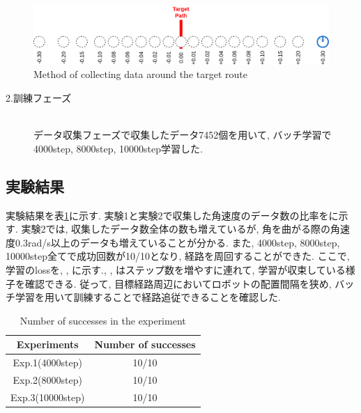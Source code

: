 \begin{figure}[h]
  \centering
  \includegraphics[keepaspectratio, scale=0.18]{images/collect-data.png}
  \caption{Method of collecting data around the target route}
  \label{Fig:collect-data}
  \end{figure}

\begin{description}
  \item[2.訓練フェーズ]\mbox{}\\データ収集フェーズで収集したデータ7452個を用いて, バッチ学習で4000step, 8000step, 10000step学習した. 
\end{description}

\newpage
\subsection{実験結果}
実験結果を表\ref{tb:exp2.2}に示す. 実験1と実験2で収集した角速度のデータ数の比率をに示す. 実験2では, 収集したデータ数全体の数も増えているが, 角を曲がる際の角速度0.3rad/s以上のデータも増えていることが分かる. また, 4000step, 8000step, 10000step全てで成功回数が10/10となり, 経路を周回することができた. ここで, 学習のlossを, , に示す., , はステップ数を増やすに連れて, 学習が収束している様子を確認できる. 従って, 目標経路周辺においてロボットの配置間隔を狭め, バッチ学習を用いて訓練することで経路追従できることを確認した. 

\vspace{10mm}
\begin{table}[h]
  \centering
  \caption{Number of successes in the experiment}
  \begin{tabular}{|c|c|} \hline
    Experiments & Number of successes \\ \hline
    Exp.1(4000step) & 10/10 \\ \hline
    Exp.2(8000step) & 10/10 \\ \hline
    Exp.3(10000step) & 10/10 \\ \hline
  \end{tabular}
  \label{tb:exp2.2}
\end{table}

